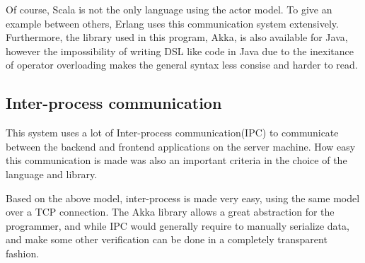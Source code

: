 Of course, Scala is not the only language using the actor model. To 
give an example between others, Erlang uses this communication system 
extensively. Furthermore, the library used in this program, Akka, is
also available for Java, however the impossibility of writing DSL like 
code in Java due to the inexitance of operator overloading makes the 
general syntax less consise and harder to read.
%
\subsection{Inter-process communication}
This system uses a lot of Inter-process communication(IPC) to communicate between the backend and frontend
applications on the server machine. How easy this communication is made was 
also an important criteria in the choice of the language and library.

Based on the above model, inter-process is made very easy, 
using the same model over a TCP connection. The Akka library allows a 
great abstraction for the programmer, and while IPC would 
generally require to manually serialize data, and make
 some other verification  can be done in a completely transparent fashion.
